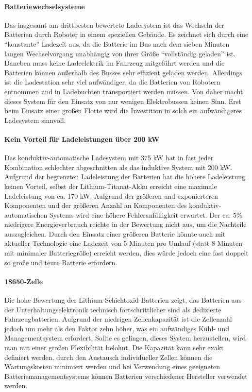 \paragraph{Batteriewechselsysteme} Das insgesamt am drittbesten bewertete Ladesystem ist das Wechseln der Batterien durch Roboter in einem speziellen Gebäude. Es zeichnet sich durch eine "`konstante"' Ladezeit aus, da die Batterie im Bus nach dem sieben Minuten langen Wechselvorgang unabhängig von ihrer Größe "`vollständig geladen"' ist. Daneben muss keine Ladeelektrik im Fahrzeug mitgeführt werden und die Batterien können außerhalb des Busses sehr effizient geladen werden. Allerdings ist die Ladestation sehr viel aufwändiger, da die Batterien  von Robotern entnommen und in Ladebuchten transportiert werden müssen. Von daher macht dieses System für den Einsatz von nur wenigen Elektrobussen keinen Sinn. Erst beim Einsatz einer großen Flotte wird die Investition in solch ein aufwändigeres Ladesystem sinnvoll.

\paragraph{Kein Vorteil für Ladeleistungen über 200 kW} Das konduktiv-automatische Ladesystem mit 375 kW hat in fast jeder Kombination schlechter abgeschnitten als das induktive System mit 200 kW. Aufgrund der begrenzten Ladeleistung der Batterien hat die höhere Ladeleistung keinen Vorteil, selbst der Lithium-Titanat-Akku erreicht eine maximale Ladeleistung von ca. 170 kW. Aufgrund der größeren und exponierteren Komponenten und der größeren Anzahl an Komponenten des konduktiv-automatischen Systems wird eine höhere Fehleranfälligkeit erwartet. Der ca. 5\% niedrigere Energieverbrauch reichte in der Bewertung nicht aus, um die Nachteile auszugleichen. Durch den Einsatz einer größeren Batterie könnte auch mit aktueller Technologie eine Ladezeit von 5 Minuten pro Umlauf (statt 8 Minuten mit minimaler Batteriegröße) erreicht werden, dies würde jedoch eine fast doppelt so große und teure Batterie erfordern.

\paragraph{18650-Zelle} Die hohe Bewertung der Lithium-Schichtoxid-Batterien zeigt, das Batterien aus der Unterhaltungselektronik technisch fortschrittlicher sind als dedizierte Fahrzeugbatterien. Aufgrund der niedrigen Zellenkapazität ist die Zellenzahl jedoch um mehr als den Faktor zehn höher, was ein aufwändiges Kühl- und Managementsystem erfordert. Sollte es gelingen, dieses System herzustellen, wird man mit einer großen Flexibilität belohnt. Die Kapazität kann sehr exakt definiert werden, durch den Austausch individueller Zellen können die Wartungskosten minimiert werden und bei Verwendung eines geeigneten Batteriemanagementsystems können Batterien verschiedener Hersteller verwendet werden.

